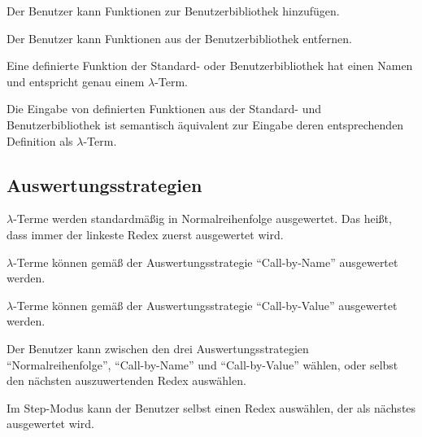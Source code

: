 \documentclass[parskip=full,11pt,twoside]{scrartcl}
\begin{document}
Der Benutzer kann Funktionen zur Benutzerbibliothek hinzufügen.

Der Benutzer kann Funktionen aus der Benutzerbibliothek entfernen.

Eine definierte Funktion der Standard- oder Benutzerbibliothek hat einen Namen und entspricht genau einem $\lambda$-Term.

Die Eingabe von definierten Funktionen aus der Standard- und Benutzerbibliothek ist semantisch äquivalent zur Eingabe deren entsprechenden Definition als $\lambda$-Term.









\subsection{Auswertungsstrategien}

$\lambda$-Terme werden standardmäßig in Normalreihenfolge ausgewertet. Das heißt, dass immer der linkeste Redex zuerst ausgewertet wird.

$\lambda$-Terme können gemäß der Auswertungsstrategie \enquote{Call-by-Name} ausgewertet werden.

$\lambda$-Terme können gemäß der Auswertungsstrategie \enquote{Call-by-Value} ausgewertet werden.

Der Benutzer kann zwischen den drei Auswertungsstrategien \enquote{Normalreihenfolge}, \enquote{Call-by-Name} und \enquote{Call-by-Value} wählen, oder selbst den nächsten auszuwertenden Redex auswählen.

Im Step-Modus kann der Benutzer selbst einen Redex auswählen, der als nächstes ausgewertet wird.
\end{document}
